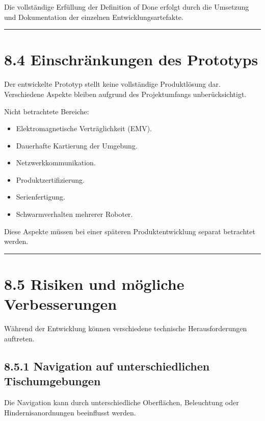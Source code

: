 \documentclass[
]{article}
\providecommand{\tightlist}{%
  \setlength{\itemsep}{0pt}\setlength{\parskip}{0pt}}
\begin{document}
Die vollständige Erfüllung der Definition of Done erfolgt durch die
Umsetzung und Dokumentation der einzelnen Entwicklungsartefakte.

\begin{center}\rule{0.5\linewidth}{0.5pt}\end{center}

\section{8.4 Einschränkungen des
Prototyps}\label{einschruxe4nkungen-des-prototyps}

Der entwickelte Prototyp stellt keine vollständige Produktlösung dar.
Verschiedene Aspekte bleiben aufgrund des Projektumfangs
unberücksichtigt.

Nicht betrachtete Bereiche:

\begin{itemize}
\tightlist
\item
  Elektromagnetische Verträglichkeit (EMV).
\item
  Dauerhafte Kartierung der Umgebung.
\item
  Netzwerkkommunikation.
\item
  Produktzertifizierung.
\item
  Serienfertigung.
\item
  Schwarmverhalten mehrerer Roboter.
\end{itemize}

Diese Aspekte müssen bei einer späteren Produktentwicklung separat
betrachtet werden.

\begin{center}\rule{0.5\linewidth}{0.5pt}\end{center}

\section{8.5 Risiken und mögliche
Verbesserungen}\label{risiken-und-muxf6gliche-verbesserungen}

Während der Entwicklung können verschiedene technische Herausforderungen
auftreten.

\subsection{8.5.1 Navigation auf unterschiedlichen
Tischumgebungen}\label{navigation-auf-unterschiedlichen-tischumgebungen}

Die Navigation kann durch unterschiedliche Oberflächen, Beleuchtung oder
Hindernisanordnungen beeinflusst werden.
\end{document}
